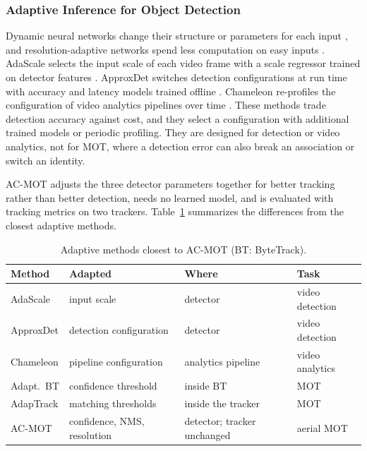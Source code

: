 \documentclass[journal]{new-aiaa}
\begin{document}
\subsubsection{Adaptive Inference for Object Detection}
Dynamic neural networks change their structure or parameters for each input
\cite{han2022dynamic}, and resolution-adaptive networks spend less computation
on easy inputs \cite{yang2020ranet}. AdaScale selects the input scale of each
video frame with a scale regressor trained on detector features
\cite{chin2019adascale}. ApproxDet switches detection configurations at run
time with accuracy and latency models trained offline \cite{xu2020approxdet}.
Chameleon re-profiles the configuration of video analytics pipelines over time
\cite{jiang2018chameleon}. These methods trade detection accuracy against cost, and they select a
configuration with additional trained models or periodic profiling. They are
designed for detection or video analytics, not for MOT, where a detection
error can also break an association or switch an identity.

AC-MOT adjusts the three detector parameters together for better tracking
rather than better detection, needs no learned model, and is evaluated with
tracking metrics on two trackers. Table~\ref{tab:related} summarizes the
differences from the closest adaptive methods.

\begin{table}[htbp]
\caption{Adaptive methods closest to AC-MOT (BT: ByteTrack).}
\label{tab:related}
\centering\footnotesize
\setlength{\tabcolsep}{3pt}
\begin{tabular}{@{}l>{\raggedright\arraybackslash}p{20mm}>{\raggedright\arraybackslash}p{17mm}>{\raggedright\arraybackslash}p{13mm}@{}}
\toprule
Method & Adapted & Where & Task\\
\midrule
AdaScale \cite{chin2019adascale} & input scale & detector & video detection\\
ApproxDet \cite{xu2020approxdet} & detection configuration & detector & video detection\\
Chameleon \cite{jiang2018chameleon} & pipeline configuration & analytics pipeline & video analytics\\
Adapt.\ BT \cite{ma2023adaptivebytetrack} & confidence threshold & inside BT & MOT\\
AdapTrack \cite{shim2024adaptrack} & matching thresholds & inside the tracker & MOT\\
AC-MOT & confidence, NMS, resolution & detector; tracker unchanged & aerial MOT\\
\bottomrule
\end{tabular}
\end{table}
\end{document}

